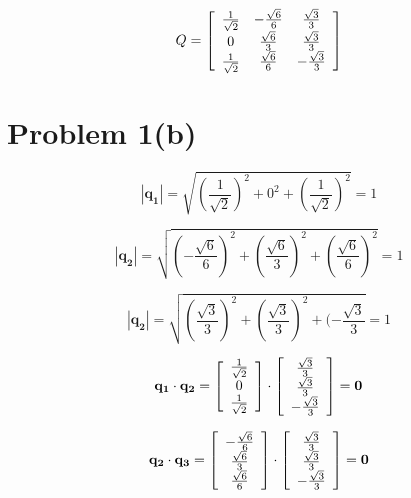 \documentclass{article}
\begin{document}
\[
Q = \left[\begin{array}{*{4}c}
    \frac{1}{\sqrt{2}} & -\frac{\sqrt{6}}{6} & \frac{\sqrt{3}}{3} \\
    0 & \frac{\sqrt{6}}{3} & \frac{\sqrt{3}}{3} \\
    \frac{1}{\sqrt{2}} & \frac{\sqrt{6}}{6} & - \frac{\sqrt{3}}{3}

 \end{array}\right]
\]


\section*{Problem 1(b)}

$$|\mathbf{q_1}| = \sqrt{(\frac{1}{\sqrt{2}})^2 +
    0^2 +
    (\frac{1}{\sqrt{2}})^2 } = 1$$

$$|\mathbf{q_2}| = \sqrt{(-\frac{\sqrt{6}}{6})^2 +
    (\frac{\sqrt{6}}{3})^2 +
    (\frac{\sqrt{6}}{6})^2 } = 1$$


$$|\mathbf{q_2}| = \sqrt{(\frac{\sqrt{3}}{3})^2 +
    (\frac{\sqrt{3}}{3})^2 +
    (-\frac{\sqrt{3}}{3} } = 1$$


$$
\mathbf{q_1} \cdot \mathbf{q_2} = 
\left[ \begin{array} {*{3}c} 
    \frac{1}{\sqrt{2}} \\
    0 \\
    \frac{1}{\sqrt{2}} \\
\end{array}\right] 
\cdot 
\left[ \begin{array} {*{3}c} 
    \frac{\sqrt{3}}{3} \\
    \frac{\sqrt{3}}{3} \\
    - \frac{\sqrt{3}}{3} \\
\end{array}\right]
= \mathbf{0}
$$

$$
\mathbf{q_2} \cdot \mathbf{q_3} = 
\left[ \begin{array} {*{3}c} 
    -\frac{\sqrt{6}}{6} \\
    \frac{\sqrt{6}}{3} \\
    \frac{\sqrt{6}}{6} \\
\end{array}\right] 
\cdot 
\left[ \begin{array} {*{3}c} 
    \frac{\sqrt{3}}{3} \\
    \frac{\sqrt{3}}{3} \\
    - \frac{\sqrt{3}}{3} \\
\end{array}\right]
= \mathbf{0}
$$
\end{document}

